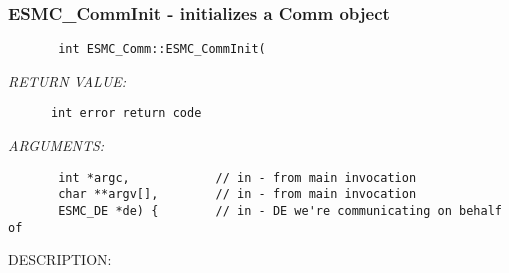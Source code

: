  
\parskip        0pt
\parindent      0pt
\baselineskip  11pt
 
\def\bv{\begin{verbatim}}
\def\ev{\end{verbatim}}
\def\be{\begin{equation}}
\def\ee{\end{equation}}
\def\bea{\begin{eqnarray}}
\def\eea{\end{eqnarray}}
\def\bi{\begin{itemize}}
\def\ei{\end{itemize}}
\def\bn{\begin{enumerate}}
\def\en{\end{enumerate}}
\def\bd{\begin{description}}
\def\ed{\end{description}}
\def\({\left (}
\def\){\right )}
\def\[{\left [}
\def\]{\right ]}
\def\<{\left  \langle}
\def\>{\right \rangle}
\def\cI{{\cal I}}
\def\diag{\mathop{\rm diag}}
\def\tr{\mathop{\rm tr}}


 
\subsubsection{ESMC\_CommInit - initializes a Comm object}


  
\begin{verbatim}       int ESMC_Comm::ESMC_CommInit(\end{verbatim}{\em RETURN VALUE:}
\begin{verbatim}      int error return code\end{verbatim}{\em ARGUMENTS:}
\begin{verbatim}       int *argc,            // in - from main invocation
       char **argv[],        // in - from main invocation
       ESMC_DE *de) {        // in - DE we're communicating on behalf of\end{verbatim}
{\sf DESCRIPTION:\\ }


